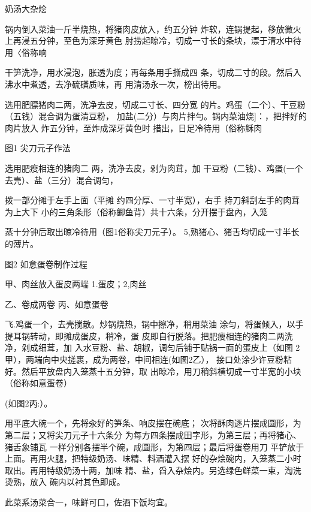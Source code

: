 \begin{recipe}{奶汤大杂烩}

\ingredients



\cooking

\step 锅内倒入菜油一斤半烧热，将猪肉皮放入，约五分钟 炸软，连锅提起，移放微火上再浸五分钟，至色为深牙黄色 肘捞起晾冷，切成一寸长的条块，漂于清水中待用〈俗称响

\step 

\step 干笋洗净，用水浸泡，胀透为度；再每条用手撕成四 条，切成二寸的段。然后入沸水中煮透，去净硫磺质味，再 用清汤永一次，榜出待用。

\step 选用肥膘猪肉二两，洗净去皮，切成二寸长、四分宽 的片。鸡蛋（二个）、干豆粉（五钱）混合调为蛋清豆粉， 加盐(二分）与肉片拌勻。锅内菜油烧]：，把拌好的肉片放入 炸五分钟，至炸成深牙黄色时 措出，日足冷待用（俗称穌肉

图1 尖刀元子作法

选用肥瘦相连的猪肉二 两，洗净去皮，剁为肉茸，加 干豆粉（二钱）、鸡蛋(一个 去壳）、盐（三分）混合调匀，

拨一部分摊于左手上面（平摊 约四分厚、一寸半宽），右手 持刀斜刮左手的肉茸为上大下 小的三角条形（俗称鲫鱼背）共十六条，分开摆于盘內，入笼

蒸十分钟后取出晾冷待用（图1俗称尖刀元子）。 5,熟猪心、猪舌均切成一寸半长的薄片。

图2 如意蛋卷制作过程

甲、肉丝放入蛋皮两端 1.蛋皮；2,肉丝

乙、卷成两卷 丙、如意蛋卷

飞.鸡蛋一个，去壳搅散。炒锅烧热，锅中擦净，稍用菜油 涂匀，将蛋倾入，以手提耳锅转动，即摊成蛋皮，稍冷，蛋 皮即自行脱落。把肥瘦相连的猪肉二两洗净，剁成细茸，加 入水豆粉、盐、胡椒，调匀后铺于贴锅一面的蛋皮上（如图 2甲），两端向中央搓裹，成为两卷，中间相连(如图2乙）， 接口处涂少许豆粉粘好。然后平放盘内入笼蒸十五分钟，取 出晾冷，用刀稍斜横切成一寸半宽的小块（俗称如意蛋卷）

(如图2丙:）。

\step 用平底大碗一个，先将汆好的笋条、响皮摆在碗底； 次将酥肉逐片摆成圆形，为第二层；又将尖刀元子十六条分 为每方四条摆成田字形，为第三层；再将猪心、猪舌象铺瓦 一样分别各摆半个碗，成圆形，为第四层；最后将蛋卷用刀 平铲放于上面。再用火腿，把特级奶汤、味精、料酒灌入摆 好的杂烩碗内，入笼蒸二小时取出。再用特级奶汤十两，加味 精、盐，舀入杂烩内。另选绿色鲜菜一束，淘洗烫熟，放入 碗内以衬其色即成。

\notes

此菜系汤菜合一，味鲜可口，佐酒下饭均宜。

\end{recipe}

